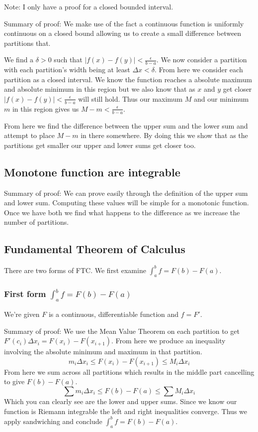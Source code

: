 \documentclass{article}
\begin{document}
Note: I only have a proof for a closed bounded interval.

Summary of proof: We make use of the fact a continuous function is uniformly
continuous on a closed bound allowing us to create a small difference between
partitions that.

We find a $\delta > 0$ such that $|f(x) - f(y)| < \frac{\epsilon}{b-a}$. We now
consider a partition with each partition's width being at least
$\Delta x < \delta$. From here we consider each partition as a closed interval.
We know the function reaches a absolute maximum and absolute minimum in this
region but we also know that as $x$ and $y$ get closer
$|f(x) - f(y)| < \frac{\epsilon}{b-a}$ will still hold. Thus our maximum $M$
and our minimum $m$ in this region gives us
$M - m < \frac{\epsilon}{b-a}$.

From here we find the difference between the upper sum and the lower sum
and attempt to place $M - m$ in there somewhere. By doing this we show that
as the partitions get smaller our upper and lower sums get closer too.

\subsection{Monotone function are integrable}
Summary of proof: We can prove easily through the definition of the upper sum
and lower sum. Computing these values will be simple for a monotonic function.
Once we have both we find what happens to the difference as we increase the
number of partitions.

\subsection{Fundamental Theorem of Calculus}
There are two forms of FTC\@. We first examine $\int_a^b f = F(b) - F(a)$.
\subsubsection{First form $\int_a^b f = F(b) - F(a)$}
We're given $F$ is a continuous, differentiable function and $f = F'$.

Summary of proof: We use the Mean Value Theorem on each partition
to get $F'(c_i)\Delta x_i = F(x_i) - F(x_{i+1})$. From here we produce an
inequality involving the absolute minimum and maximum in that partition.
\[
    m_i \Delta x_i \leq F(x_i) - F(x_{i+1}) \leq M_i \Delta x_i
\]
From here we sum across all partitions which results in the middle part
cancelling to give $F(b) - F(a)$.
\[
    \sum m_i \Delta x_i \leq F(b) - F(a) \leq \sum M_i \Delta x_i
\]
Which you can clearly see are the lower and upper sums. Since we know our
function is Riemann integrable the left and right inequalities converge.
Thus we apply sandwiching and conclude $\int_a^b f = F(b) - F(a)$.
\end{document}
